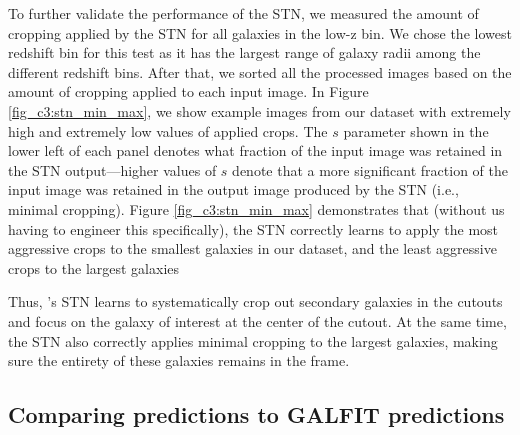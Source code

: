 To further validate the performance of the STN, we measured the amount of cropping applied by the STN for all galaxies in the low-z bin. We chose the lowest redshift bin for this test as it has the largest range of galaxy radii among the different redshift bins. After that, we sorted all the processed images based on the amount of cropping applied to each input image. In Figure \ref{fig_c3:stn_min_max}, we show example images from our dataset with extremely high and extremely low values of applied crops. The $s$ parameter shown in the lower left of each panel denotes what fraction of the input image was retained in the STN output---higher values of $s$ denote that a more significant fraction of the input image was retained in the output image produced by the STN  (i.e., minimal cropping). Figure \ref{fig_c3:stn_min_max} demonstrates that (without us having to engineer this specifically), the STN correctly learns to apply the most aggressive crops to the smallest galaxies in our dataset, and the least aggressive crops to the largest galaxies

Thus, \gampen{}'s STN learns to systematically crop out secondary galaxies in the cutouts and focus on the galaxy of interest at the center of the cutout. At the same time, the STN also correctly applies minimal cropping to the largest galaxies, making sure the entirety of these galaxies remains in the frame. 

\subsection{Comparing \gampen{} predictions to GALFIT predictions} \label{sec_c3:gampen_v_galfit}

